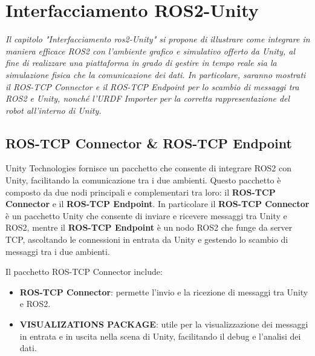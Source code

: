 \documentclass[11pt]{report}
\begin{document}
\section{Interfacciamento ROS2-Unity}
\label{sec:interfacciamento_ros2_unity}
\textit{Il capitolo "Interfacciamento ros2-Unity" si propone di illustrare come integrare in maniera efficace ROS2 con l’ambiente grafico e simulativo offerto da Unity, al fine di realizzare una piattaforma in grado di gestire in tempo reale sia la simulazione fisica che la comunicazione dei dati. In particolare, saranno mostrati il ROS-TCP Connector e il ROS-TCP Endpoint per lo scambio di messaggi tra ROS2 e Unity, nonché l'URDF Importer per la corretta rappresentazione del robot all'interno di Unity.}

\subsection{ROS-TCP Connector \& ROS-TCP Endpoint}
Unity Technologies fornisce un pacchetto che consente di integrare ROS2 con Unity, facilitando la comunicazione tra i due ambienti. Questo pacchetto è composto da due nodi principali e complementari tra loro: il \textbf{ROS-TCP Connector} e il \textbf{ROS-TCP Endpoint}.
In particolare il \textbf{ROS-TCP Connector} è un pacchetto Unity che consente di inviare e ricevere messaggi tra Unity e ROS2, mentre il \textbf{ROS-TCP Endpoint} è un nodo ROS2 che funge da server TCP, ascoltando le connessioni in entrata da Unity e gestendo lo scambio di messaggi tra i due ambienti.
\newline

Il pacchetto ROS-TCP Connector include:

\begin{itemize}
    \item \textbf{ROS-TCP Connector}: permette l’invio e la ricezione di messaggi tra Unity e ROS2.
    \item \textbf{VISUALIZATIONS PACKAGE}: utile per la visualizzazione dei messaggi in entrata e in uscita nella scena di Unity, facilitando il debug e l'analisi dei dati.
\end{itemize}
\end{document}
